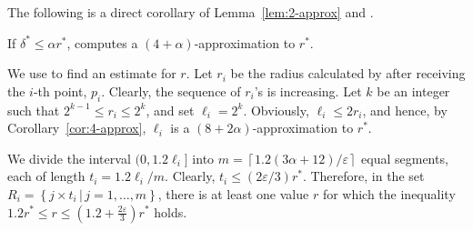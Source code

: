 \documentclass[envcountsame]{cls/cccg15}
\newcommand{\set}[1]{\left\{ #1 \right\}}
\newcommand{\ceil}[1]{\left\lceil{#1}\right\rceil}
\newcommand{\provided}{\,|\,}
\newcommand{\lee}{\leqslant}
\newcommand{\gee}{\geqslant}
\renewcommand{\le}{\lee}
\renewcommand{\ge}{\gee}
\newcommand{\eps}{\varepsilon}
\begin{document}
\noindent 
The following is a direct corollary of Lemma~\ref{lem:2-approx} and .

\begin{cor} \label{cor:4-approx}
	If $\delta^* \le \alpha r^*$, 
	 computes a $(4 + \alpha)$-approximation to $r^*$. 
\end{cor}




We use  to find an estimate for $r$. 
Let $r_i$ be the radius calculated by  after receiving
the $i$-th point, $p_i$.
Clearly, the sequence of $r_i$'s is increasing.
Let $k$ be an integer such that $2^{k-1} \le r_i \le 2^{k}$, and set $\ell_i = 2^{k}$.
Obviously, $\ell_i \le 2 r_i$,
and hence, by Corollary~\ref{cor:4-approx}, 
$\ell_i$ is a $(8 + 2\alpha)$-approximation to $r^*$.

We divide the interval $(0, 1.2 \ell_i]$ 
into $m=\ceil{{1.2 (3 \alpha+12)}/{\eps}}$ equal segments,
each of length $t_i = 1.2 \ell_i / m$.
Clearly,  $t_i \le (2\eps/3) r^*$.
Therefore, in the set
$R_i = \set{j \times t_i \provided j = 1, \dots, m}$,
there is at least one value $r$ for which the  
inequality $1.2 r^* \le r \le (1.2 + \frac{2\eps}{3})r^*$ holds.

\end{document}

